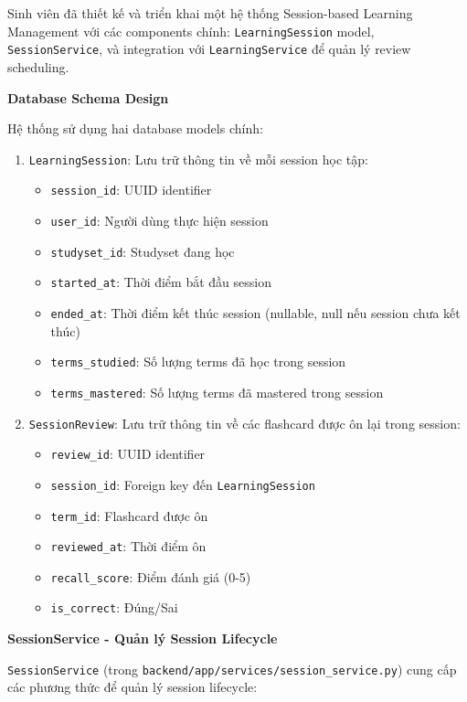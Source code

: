 \documentclass[../DoAn.tex]{subfiles}
\begin{document}
Sinh viên đã thiết kế và triển khai một hệ thống Session-based Learning Management với các components chính: \texttt{LearningSession} model, \texttt{SessionService}, và integration với \texttt{LearningService} để quản lý review scheduling.

\textbf{Database Schema Design}

Hệ thống sử dụng hai database models chính:

\begin{enumerate}
    \item \texttt{LearningSession}: Lưu trữ thông tin về mỗi session học tập:
    \begin{itemize}
        \item \texttt{session\_id}: UUID identifier
        \item \texttt{user\_id}: Người dùng thực hiện session
        \item \texttt{studyset\_id}: Studyset đang học
        \item \texttt{started\_at}: Thời điểm bắt đầu session
        \item \texttt{ended\_at}: Thời điểm kết thúc session (nullable, null nếu session chưa kết thúc)
        \item \texttt{terms\_studied}: Số lượng terms đã học trong session
        \item \texttt{terms\_mastered}: Số lượng terms đã mastered trong session
    \end{itemize}
    
    \item \texttt{SessionReview}: Lưu trữ thông tin về các flashcard được ôn lại trong session:
    \begin{itemize}
        \item \texttt{review\_id}: UUID identifier
        \item \texttt{session\_id}: Foreign key đến \texttt{LearningSession}
        \item \texttt{term\_id}: Flashcard được ôn
        \item \texttt{reviewed\_at}: Thời điểm ôn
        \item \texttt{recall\_score}: Điểm đánh giá (0-5)
        \item \texttt{is\_correct}: Đúng/Sai
    \end{itemize}
\end{enumerate}

\textbf{SessionService - Quản lý Session Lifecycle}

\texttt{SessionService} (trong \texttt{backend/app/services/session\_service.py}) cung cấp các phương thức để quản lý session lifecycle:
\end{document}
